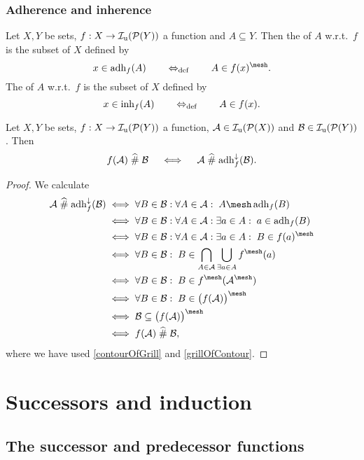 \subsection{Adherence and inherence}
\begin{definition}
Let $X, Y$ be sets, $f: X\to \operatorname{\mathcal{I}_u}(\operatorname{\mathcal{P}}(Y))$ a function and $A\subseteq Y$. Then the  of $A$ w.r.t.\ $f$ is the subset of $X$ defined by
\[ x\in \adh_f(A) \quad\defequiv\quad A\in f(x)^\mesh. \]
The  of $A$ w.r.t.\ $f$ is the subset of $X$ defined by
\[ x\in \operatorname{inh}_f(A) \quad\quad\Leftrightarrow_{\text{def}}\quad\quad A\in f(x). \]
\end{definition}

\begin{proposition} \label{adherenceContourDuality}
Let $X, Y$ be sets, $f: X\to \operatorname{\mathcal{I}_u}(\operatorname{\mathcal{P}}(Y))$ a function, $\mathcal{A} \in \operatorname{\mathcal{I}_u}(\operatorname{\mathcal{P}}(X))$ and $\mathcal{B}\in \operatorname{\mathcal{I}_u}(\operatorname{\mathcal{P}}(Y))$. Then
\[ f(\mathcal{A}) \mathrel{\widehat{\#}} \mathcal{B} \quad\iff\quad \mathcal{A} \mathrel{\widehat{\#}} \operatorname{adh}_f^\downarrow(\mathcal{B}). \]
\end{proposition}
\begin{proof}
We calculate
\begin{align*}
\mathcal{A} \amesh \adh_f^\imf(\mathcal{B}) &\iff \forall B\in \mathcal{B}: \forall A\in \mathcal{A}: \; A\mesh \adh_f(B) \\
&\iff \forall B\in \mathcal{B}: \forall A\in \mathcal{A}: \exists a\in A: \; a \in \adh_f(B) \\
&\iff \forall B\in \mathcal{B}: \forall A\in \mathcal{A}: \exists a\in A: \; B\in f(a)^\mesh \\
&\iff \forall B\in \mathcal{B}: \; B\in \bigcap_{A\in \mathcal{A}}\bigcup_{\exists a\in A} f^\mesh(a) \\
&\iff \forall B\in \mathcal{B}: \; B\in f^\mesh(\mathcal{A}^\mesh) \\
&\iff \forall B\in \mathcal{B}: \; B\in \big(f(\mathcal{A})\big)^\mesh \\
&\iff \mathcal{B} \subseteq \big(f(\mathcal{A})\big)^\mesh \\
&\iff f(\mathcal{A}) \amesh \mathcal{B},
\end{align*}
where we have used \ref{contourOfGrill} and \ref{grillOfContour}.
\end{proof}

\chapter{Successors and induction}
\section{The successor and predecessor functions}


